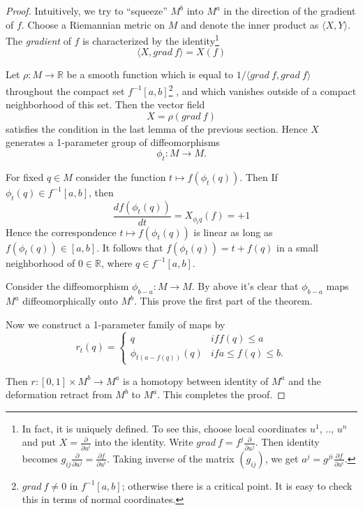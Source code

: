 \documentclass[a4paper,11pt,reqno]{amsart}
\newcommand{\RR}{\mathbb{R}}      %
\begin{document}
\begin{proof}
  Intuitively, we try to ``squeeze'' $M^b$ into $M^a$ in the direction of the
  gradient of $f$. Choose a Riemannian metric on $M$ and denote the inner
  product as $\langle X, Y \rangle$. The \emph{gradient} of $f$ is characterized
  by the identity\footnote{In fact, it is uniquely defined. To see this, choose
    local coordinates $u^1$, .., $u^n$ and put $X = \frac{\partial}{\partial
      u^i}$ into the identity. Write $grad \: f = f^j\frac{\partial}{\partial
      u^j}$. Then identity becomes $g_{ij}\frac{\partial}{\partial u^j} =
    \frac{\partial f}{\partial u^i}$. Taking inverse of the matrix $(g_{ij})$,
    we get $a^j = g^{ji}\frac{\partial f}{\partial u^i}$.}
  \begin{equation}
    \langle X, grad \: f\rangle = X(f)
  \end{equation}
  
  Let $\rho : M \to \RR$ be a smooth function which is equal to $1/\langle grad
  \: f, grad \: f \rangle$ throughout the compact set
  $f^{-1}[a,b]$\footnote{$grad \: f \ne 0$ in $f^{-1}[a,b]$; otherwise there is
    a critical point. It is easy to check this in terms of normal coordinates.}
  , and which vanishes outside of a compact neighborhood of this set. Then the
  vector field 
  \begin{equation}
    X = \rho (grad \: f)
  \end{equation}
  satisfies the condition in the last lemma of the previous section. Hence $X$
  generates a 1-parameter group of diffeomorphisms
  \begin{equation}
    \phi_t : M \to M.
  \end{equation}

  For fixed $q \in M$ consider the function $t \mapsto f(\phi_t(q))$. Then If
  $\phi_t(q) \in f^{-1}[a,b]$, then
  \begin{equation}
    \frac{d f(\phi_t(q))}{dt} = X_{\phi_t q}(f) = +1
  \end{equation}
  Hence the correspondence $t \mapsto f(\phi_t(q))$ is linear as long as
  $f(\phi_t(q)) \in [a,b]$. It follows that $f(\phi_{t}(q)) = t + f(q)$ in a
  small neighborhood of $0 \in \RR$, where $q \in f^{-1}[a,b]$.

  Consider the diffeomorphism $\phi_{b-a} : M \to M$. By above it's clear
  that $\phi_{b-a}$ maps $M^a$ diffeomorphically onto $M^b$. This prove the
  first part of the theorem.

  Now we construct a 1-parameter family of maps by
  \begin{equation}
    r_t(q) =
    \begin{cases}
      q & if f(q) \le a \\
      \phi_{t(a-f(q))}(q) & if a \le f(q) \le b.
    \end{cases}
  \end{equation}

  Then $r : [0,1] \times M^b \to M^a$ is a homotopy between identity of $M^a$
  and the deformation retract from $M^b$ to $M^a$. This completes the proof.
\end{proof}
\end{document}
